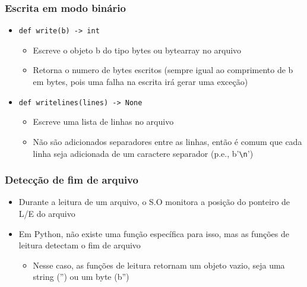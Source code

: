 \documentclass[12pt]{article}
\begin{document}
            \subsubsection{Escrita em modo binário}
            \begin{itemize}
                \item \verb|def write(b) -> int|
                \begin{itemize}
                    \item Escreve o objeto b do tipo bytes ou bytearray no 
                    arquivo
                    \item Retorna o numero de bytes escritos (sempre igual ao 
                    comprimento de b em bytes, pois uma falha na escrita irá 
                    gerar uma exceção)
                \end{itemize}
                \item \verb|def writelines(lines) -> None|
                \begin{itemize}
                    \item Escreve uma lista de linhas no arquivo
                    \item Não são adicionados separadores entre as linhas, então 
                    é comum que cada linha seja adicionada de um caractere 
                    separador (p.e., b'\verb|\n|')
                \end{itemize}
            \end{itemize}
            \subsubsection{Detecção de fim de arquivo}
            \begin{itemize}
                \item Durante a leitura de um arquivo, o S.O monitora a 
                posição do ponteiro de L/E do arquivo 
                \item Em Python, não existe uma função específica para 
                isso, mas as funções de leitura detectam o fim de arquivo
                \begin{itemize}
                    \item Nesse caso, as funções de leitura retornam um objeto 
                    vazio, seja uma string ('') ou um byte (b'')
                \end{itemize}
            \end{itemize}
\end{document}
